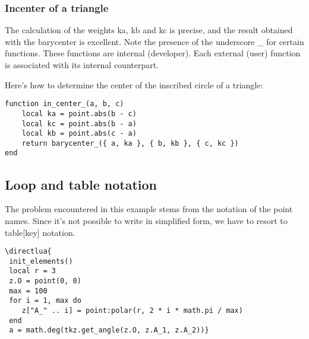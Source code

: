 \subsubsection{Incenter of a triangle} %
\label{ssub:incenter_of_a_triangle}
The calculation of the weights ka, kb and kc is precise, and the result obtained with the barycenter is excellent. Note the presence of the underscore \_ for certain functions. These functions are internal (developer). Each external (user) function is associated with its internal counterpart.

Here's how to determine the center of the inscribed circle of a triangle:
\begin{mybox}
\begin{verbatim}
function in_center_(a, b, c)
	local ka = point.abs(b - c)
	local kc = point.abs(b - a)
	local kb = point.abs(c - a)
	return barycenter_({ a, ka }, { b, kb }, { c, kc })
end \end{verbatim}
\end{mybox}


\subsection{Loop and table notation} %
\label{sub:loop_and_table_notation}
The problem encountered in this example stems from the notation of the point names. Since it's not possible to write in simplified form, we have to resort to table[key] notation.


\begin{center}
\end{center}

\begin{verbatim}
\directlua{
 init_elements()
 local r = 3
 z.O = point(0, 0)
 max = 100
 for i = 1, max do
 	z["A_" .. i] = point:polar(r, 2 * i * math.pi / max)
 end
 a = math.deg(tkz.get_angle(z.O, z.A_1, z.A_2))}
\end{verbatim}


